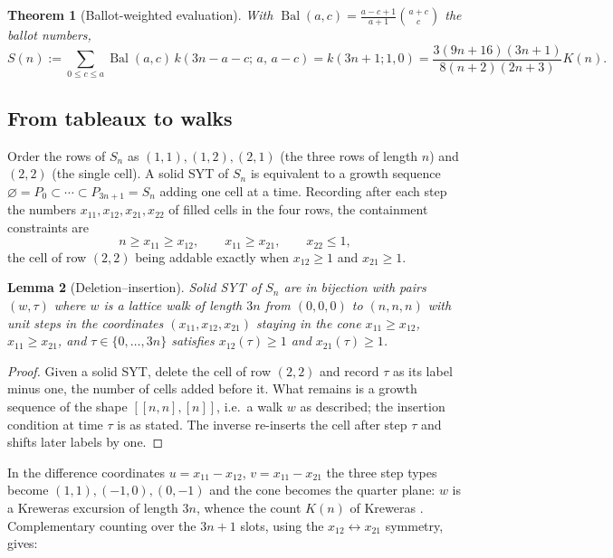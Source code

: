 \documentclass[11pt]{article}
\newtheorem{theorem}{Theorem}[section]
\newtheorem{lemma}[theorem]{Lemma}
\theoremstyle{definition}
\newcommand{\Bal}{\operatorname{Bal}}
\begin{document}
\begin{theorem}[Ballot-weighted evaluation]\label{thm:A}
With $\Bal(a,c)=\frac{a-c+1}{a+1}\binom{a+c}{c}$ the ballot numbers,
\[
  S(n):=\sum_{0\le c\le a}\Bal(a,c)\,k(3n-a-c;\,a,\,a-c)
  =k(3n+1;1,0)
  =\frac{3(9n+16)(3n+1)}{8(n+2)(2n+3)}K(n).
\]
\end{theorem}

\subsection{From tableaux to walks}

Order the rows of $S_n$ as $(1,1),(1,2),(2,1)$ (the three rows of length $n$)
and $(2,2)$ (the single cell). A solid SYT of $S_n$ is equivalent to a growth
sequence $\varnothing=P_0\subset\cdots\subset P_{3n+1}=S_n$ adding one cell at
a time. Recording after each step the numbers $x_{11},x_{12},x_{21},x_{22}$ of
filled cells in the four rows, the containment constraints are
\[
  n\ge x_{11}\ge x_{12},\qquad x_{11}\ge x_{21},\qquad x_{22}\le1,
\]
the cell of row $(2,2)$ being addable exactly when $x_{12}\ge1$ and
$x_{21}\ge1$.

\begin{lemma}[Deletion--insertion]\label{lem:bij}
Solid SYT of $S_n$ are in bijection with pairs $(w,\tau)$ where $w$ is a
lattice walk of length $3n$ from $(0,0,0)$ to $(n,n,n)$ with unit steps in the
coordinates $(x_{11},x_{12},x_{21})$ staying in the cone $x_{11}\ge x_{12}$,
$x_{11}\ge x_{21}$, and $\tau\in\{0,\dots,3n\}$ satisfies $x_{12}(\tau)\ge1$
and $x_{21}(\tau)\ge1$.
\end{lemma}

\begin{proof}
Given a solid SYT, delete the cell of row $(2,2)$ and record $\tau$ as its
label minus one, the number of cells added before it. What remains is a growth
sequence of the shape $[[n,n],[n]]$, i.e.\ a walk $w$ as described; the
insertion condition at time $\tau$ is as stated. The inverse re-inserts the
cell after step $\tau$ and shifts later labels by one.
\end{proof}

In the difference coordinates $u=x_{11}-x_{12}$, $v=x_{11}-x_{21}$ the three
step types become $(1,1),(-1,0),(0,-1)$ and the cone becomes the quarter plane:
$w$ is a Kreweras excursion of length $3n$, whence the count $K(n)$ of Kreweras
\cite{Kreweras}. Complementary counting over the $3n+1$ slots, using the
$x_{12}\leftrightarrow x_{21}$ symmetry, gives:
\end{document}
